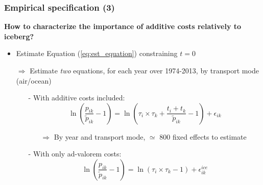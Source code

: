 \documentclass[10 pt,Helvetica, french]{beamer}
\begin{document}
\begin{frame}
\frametitle{Empirical specification (3)}
\textbf{How to characterize the importance of additive costs relatively to iceberg?} \vspace{0.1cm}
\begin{itemize}
\item Estimate Equation (\ref{eq:est_equation}) constraining $t=0$ \vspace{0.1cm}
\item[$\Rightarrow$] Estimate \textit{two} equations, for each year over 1974-2013, by transport mode (air/ocean)\vspace{0.1cm}
\begin{itemize}
\item[-] With additive costs included: 
\begin{equation}
\ln\left(\frac{p_{ik}}{\widetilde{p}_{ik}}-1 \right)= \ln \left(\tau_{i} \times \tau_{k}+\frac{t_{i} + t_{k}}{\widetilde{p}_{ik}}-1 \right) + \epsilon_{ik}
\end{equation}  
\begin{itemize}
\item[$\Rightarrow$] By year and transport mode, $\simeq$ 800 fixed effects to estimate   \vspace{0.1cm}
\end{itemize}
\item[-] With only ad-valorem costs:
\begin{equation}
\ln\left(\frac{p_{ik}}{\widetilde{p}_{ik}}-1 \right)= \ln \left(\tau_{i} \times \tau_{k}-1 \right) + \epsilon^{ice}_{ik} \label{eq:model_nlI}
\end{equation}
\end{itemize}
\end{itemize}
\end{frame}
\end{document}
